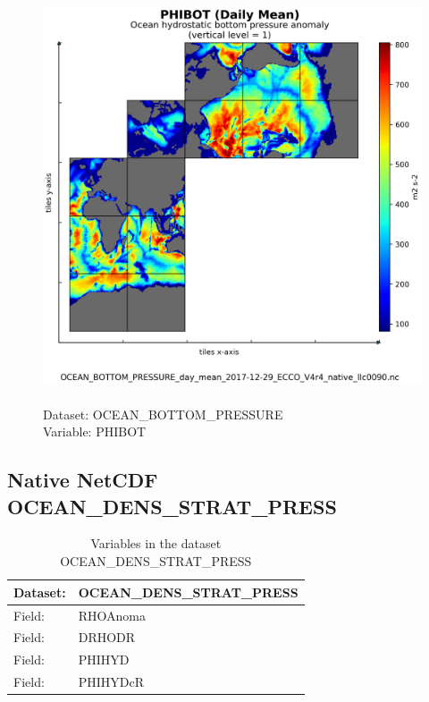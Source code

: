 \begin{figure}[H]
\centering
\includegraphics[scale=0.5]{../images/plots/native_plots/Ocean_Bottom_Pressure/PHIBOT.png}
\caption{\\Dataset: OCEAN\_BOTTOM\_PRESSURE\\Variable: PHIBOT}
\label{tab:table-OCEAN_BOTTOM_PRESSURE_PHIBOT-Plot}
\end{figure}
\pagebreak
\subsection{Native NetCDF OCEAN\_DENS\_STRAT\_PRESS}
\newp
\begin{longtable}{|p{}|p{}|}
\caption{Variables in the dataset OCEAN\_DENS\_STRAT\_PRESS}
\label{tab:table-OCEAN_DENS_STRAT_PRESS-fields} \\ 
\hline \endhead \hline \endfoot
\rowcolor{lightgray} \textbf{Dataset:} & \textbf{OCEAN\_DENS\_STRAT\_PRESS} \\ \hline
Field: &RHOAnoma \\ \hline
Field: &DRHODR \\ \hline
Field: &PHIHYD \\ \hline
Field: &PHIHYDcR \\ \hline
\end{longtable}

